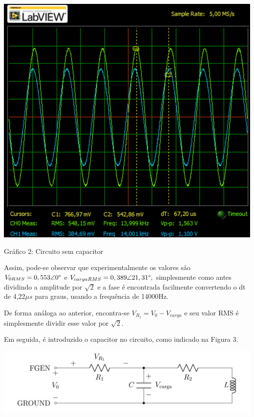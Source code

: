 \documentclass[a4 paper]{article}
\begin{document}
\begin{table}[h]
\centering
\includegraphics[scale=0.3575]{rgadicoas/rgadicoa1}
\end{table}

\begin{center}
Gráfico 2: Circuito sem capacitor
\end{center}

Assim, pode-se observar que experimentalmente os valores são $V_{0RMS}=0,553\angle0\text{\textdegree}$ e $V_{cargaRMS}=0,389\angle21,31\text{\textdegree},$ simplesmente como antes dividindo a amplitude por $\sqrt{2}$ e a fase é encontrada facilmente convertendo o dt de 4,22$\mu s$ para graus, usando a frequência de 14000Hz.

De forma análoga ao anterior, encontra-se $V_{R_1}=V_0-V_{carga}$ e seu valor RMS é simplesmente dividir esse valor por $\sqrt{2}$.

\vspace{1cm}


\vspace{1cm}
Em seguida, é introduzido o capacitor no circuito, como indicado na Figura 3. 

\vspace{3cm}
\begin{table}[h]
\centering
\includegraphics[scale=0.5]{figuras/figura2}
\end{table}
\end{document}
